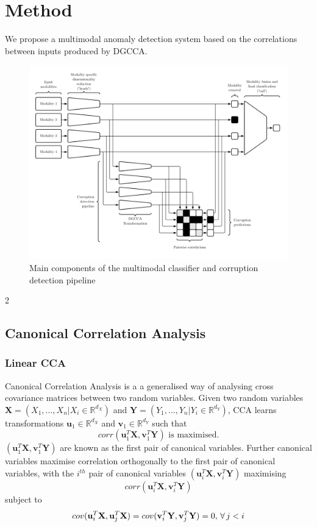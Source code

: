\chapter{Method}

We propose a multimodal anomaly detection system based on the correlations between inputs produced by DGCCA.

\begin{figure}[H]
    \centering
    \includegraphics[width=\textwidth]{images/pipeline.png}
    \caption{Main components of the multimodal classifier and corruption detection pipeline}
    \label{fig:pipeline}
\end{figure}

2
\section{Canonical Correlation Analysis}
\subsection{Linear CCA}
Canonical Correlation Analysis \cite{CCA} is a a generalised way of analysing cross covariance matrices between two random variables. Given two random variables $\mathbf{X}=(X_1,...,X_n | X_i\in\mathbb{R}^{d_X})$ and $\mathbf{Y}=(Y_1,...,Y_n | Y_i\in\mathbb{R}^{d_Y})$, CCA learns transformations $\mathbf{u}_1\in\mathbb{R}^{d_X}$ and $\mathbf{v}_1\in\mathbb{R}^{d_Y}$ such that $$corr(\mathbf{u}_1^T\mathbf{X}, \mathbf{v}_1^T\mathbf{Y}) \textrm{ is maximised.}$$ $(\mathbf{u}_1^T\mathbf{X}, \mathbf{v}_1^T\mathbf{Y})$ are known as the first pair of canonical variables. Further canonical variables maximise correlation orthogonally to the first pair of canonical variables, with the $i^{th}$ pair of canonical variables $(\mathbf{u}_i^T\mathbf{X}, \mathbf{v}_i^T\mathbf{Y})$ maximising $$corr(\mathbf{u}_i^T\mathbf{X}, \mathbf{v}_i^T\mathbf{Y})$$ subject to $$cov(\mathbf{u}_i^T\mathbf{X}, \mathbf{u}_j^T\mathbf{X}) = cov(\mathbf{v}_i^T\mathbf{Y}, \mathbf{v}_j^T\mathbf{Y}) = 0,\thinspace  \forall \thinspace  j<i$$

